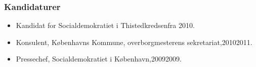 \documentclass[11pt, a4paper]{awesome-cv}
\begin{document}
\begin{cvletter}
\subsubsection*{Kandidaturer}
\begin{itemize}
\item Kandidat for Socialdemokratiet i Thistedkredsenfra 2010.
\end{itemize}
\begin{itemize}
\item Konsulent, Københavns Kommune, overborgmesterens sekretariat,20102011.
\item Pressechef, Socialdemokratiet i København,20092009.
\end{itemize}
\end{cvletter}
\end{document}

